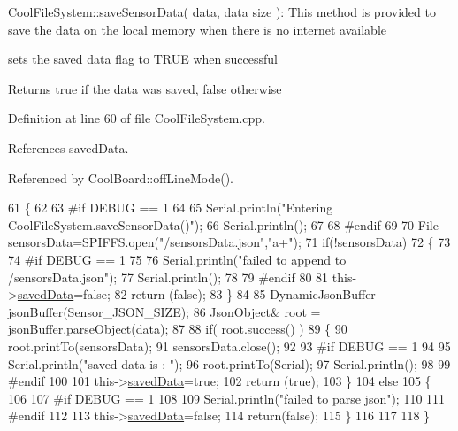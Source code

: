 Cool\+File\+System\+::save\+Sensor\+Data( data, data size )\+: This method is provided to save the data on the local memory when there is no internet available

sets the saved data flag to T\+R\+UE when successful

\begin{DoxyReturn}{Returns}
true if the data was saved, false otherwise 
\end{DoxyReturn}


Definition at line 60 of file Cool\+File\+System.\+cpp.



References saved\+Data.



Referenced by Cool\+Board\+::off\+Line\+Mode().


\begin{DoxyCode}
61 \{
62 
63 \textcolor{preprocessor}{#if DEBUG == 1}
64 
65     Serial.println(\textcolor{stringliteral}{"Entering CoolFileSystem.saveSensorData()"});
66     Serial.println();
67 
68 \textcolor{preprocessor}{#endif}
69     
70     File sensorsData=SPIFFS.open(\textcolor{stringliteral}{"/sensorsData.json"},\textcolor{stringliteral}{"a+"});
71     \textcolor{keywordflow}{if}(!sensorsData)
72     \{
73     
74 \textcolor{preprocessor}{    #if DEBUG == 1}
75     
76         Serial.println(\textcolor{stringliteral}{"failed to append to /sensorsData.json"});
77         Serial.println();
78     
79 \textcolor{preprocessor}{    #endif}
80 
81         this->\hyperlink{classCoolFileSystem_ad398e0c5c41a0c88acdf5d672aa71351}{savedData}=\textcolor{keyword}{false};
82         \textcolor{keywordflow}{return} (\textcolor{keyword}{false}); 
83     \}   
84 
85     DynamicJsonBuffer jsonBuffer(Sensor\_JSON\_SIZE);
86     JsonObject& root = jsonBuffer.parseObject(data);
87 
88     \textcolor{keywordflow}{if}( root.success() )
89     \{
90         root.printTo(sensorsData);
91         sensorsData.close();
92     
93 \textcolor{preprocessor}{    #if DEBUG == 1}
94     
95         Serial.println(\textcolor{stringliteral}{"saved data is : "});
96         root.printTo(Serial);
97         Serial.println();
98     
99 \textcolor{preprocessor}{    #endif}
100 
101         this->\hyperlink{classCoolFileSystem_ad398e0c5c41a0c88acdf5d672aa71351}{savedData}=\textcolor{keyword}{true};
102         \textcolor{keywordflow}{return} (\textcolor{keyword}{true});      
103     \}
104     \textcolor{keywordflow}{else}
105     \{
106     
107 \textcolor{preprocessor}{    #if DEBUG == 1}
108 
109         Serial.println(\textcolor{stringliteral}{"failed to parse json"});
110     
111 \textcolor{preprocessor}{    #endif}
112 
113         this->\hyperlink{classCoolFileSystem_ad398e0c5c41a0c88acdf5d672aa71351}{savedData}=\textcolor{keyword}{false};
114         \textcolor{keywordflow}{return}(\textcolor{keyword}{false});
115     \}
116     
117 
118 \}
\end{DoxyCode}
